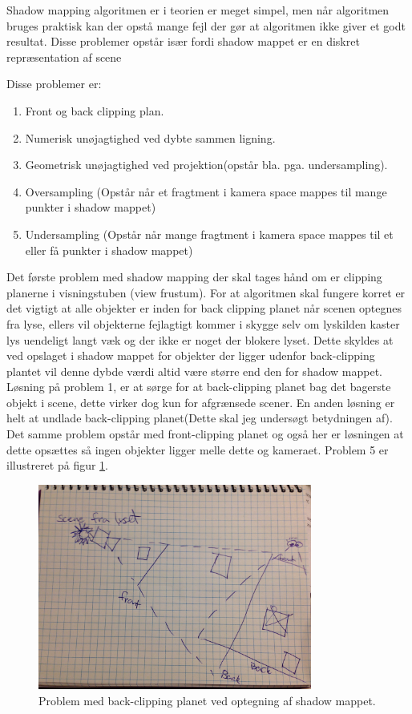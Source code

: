 \documentclass[11pt,a4paper]{article}
\begin{document}
Shadow mapping algoritmen er i teorien er meget simpel, men når algoritmen bruges praktisk kan der opstå mange fejl der gør at algoritmen ikke giver et godt resultat. Disse problemer opstår især fordi shadow mappet er en diskret repræsentation af scene 

Disse problemer er:
\begin{enumerate}
\item Front og back clipping plan.
\item Numerisk unøjagtighed ved dybte sammen ligning.
\item Geometrisk unøjagtighed ved projektion(opstår bla. pga. undersampling).
\item Oversampling (Opstår når et fragtment i kamera space mappes til mange punkter i shadow mappet)
\item Undersampling (Opstår når mange fragtment i kamera space mappes til et eller få punkter i shadow mappet)
\end{enumerate}

Det første problem med shadow mapping der skal tages hånd om er clipping planerne i visningstuben (view frustum). For at algoritmen skal fungere korret er det vigtigt at alle objekter er inden for back clipping planet når scenen optegnes fra lyse, ellers vil objekterne fejlagtigt kommer i skygge selv om lyskilden kaster lys uendeligt langt væk og der ikke er noget der blokere lyset. Dette skyldes at ved opslaget i shadow mappet for objekter der ligger udenfor back-clipping plantet vil denne dybde værdi altid være større end den for shadow mappet. Løsning på problem 1, er at sørge for at back-clipping planet bag det bagerste objekt i scene, dette virker dog kun for afgrænsede scener. En anden løsning er helt at undlade back-clipping planet(Dette skal jeg undersøgt betydningen af). Det samme problem opstår med front-clipping planet og også her er løsningen at dette opsættes så ingen objekter ligger melle dette og kameraet. Problem 5 er illustreret på figur \ref{P1}. 

\begin{figure}[ht!]
\centering
\includegraphics[width=90mm]{img/P1.jpg}
\caption{Problem med back-clipping planet ved optegning af shadow mappet.}
\label{P1}
\end{figure}
\end{document}
